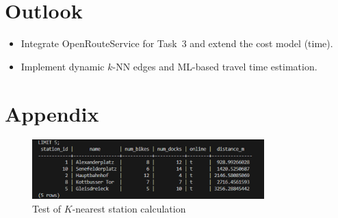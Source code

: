 \documentclass{article}
\begin{document}
\section{Outlook}
\begin{itemize}
  \item Integrate OpenRouteService for Task~3 and extend the cost model (time).
  \item Implement dynamic $k$-NN edges and ML-based travel time estimation.
\end{itemize}

\section{Appendix}


\begin{figure}[H]
    \centering
 \includegraphics[width=0.8\textwidth]{test.png}
    \caption{Test of $K$-nearest station calculation}
    \label{fig:test_k_nearest}
\end{figure}

\printbibliography
\end{document}
